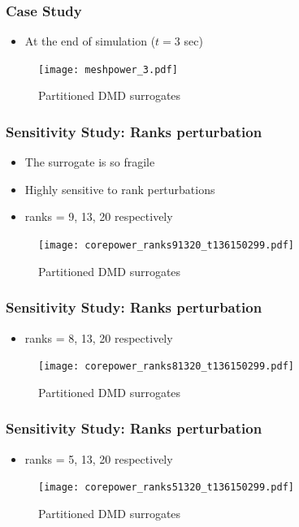 \documentclass[fleqn]{beamer}
\begin{document}
\begin{frame}
\frametitle{Case Study}
\begin{itemize}
	\item At the end of simulation ($t=3$ sec)
\end{itemize}
\begin{figure}[ht]
\texttt{[image: meshpower\_3.pdf]}
\caption{Partitioned DMD surrogates}
\end{figure}
\end{frame}

\begin{frame}
\frametitle{Sensitivity Study: Ranks perturbation}
\begin{itemize}
 \item The surrogate is so fragile
 \item Highly sensitive to rank perturbations
 \item ranks = 9, 13, 20 respectively
\end{itemize}

\begin{figure}[ht]

\texttt{[image: corepower\_ranks91320\_t136150299.pdf]}
\caption{Partitioned DMD surrogates}
\end{figure}
\end{frame}

\begin{frame}
\frametitle{Sensitivity Study: Ranks perturbation}
\begin{itemize}
 \item ranks = 8, 13, 20 respectively
\end{itemize}
\begin{figure}[ht]
\texttt{[image: corepower\_ranks81320\_t136150299.pdf]}
\caption{Partitioned DMD surrogates}
\end{figure}
\end{frame}

\begin{frame}
\frametitle{Sensitivity Study: Ranks perturbation}
\begin{itemize}
 \item ranks = 5, 13, 20 respectively
\end{itemize}

\begin{figure}[ht]

\texttt{[image: corepower\_ranks51320\_t136150299.pdf]}
\caption{Partitioned DMD surrogates}
\end{figure}
\end{frame}
\end{document}
